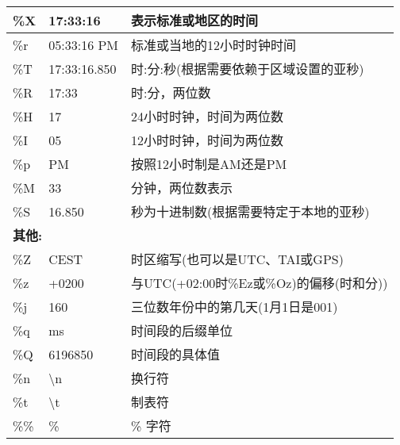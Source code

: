 \begin{itemize}
\begin{longtable}[c]{|lll|}
\multicolumn{1}{|l|}{\%X}            & \multicolumn{1}{l|}{17:33:16}          & 表示标准或地区的时间                        \\ \hline
\multicolumn{1}{|l|}{\%r}            & \multicolumn{1}{l|}{05:33:16 PM}       & 标准或当地的12小时时钟时间                         \\ \hline
\multicolumn{1}{|l|}{\%T} & \multicolumn{1}{l|}{17:33:16.850}             & 时:分:秒(根据需要依赖于区域设置的亚秒)     \\ \hline
\multicolumn{1}{|l|}{\%R}            & \multicolumn{1}{l|}{17:33}             & 时:分，两位数                               \\ \hline
\multicolumn{1}{|l|}{\%H}            & \multicolumn{1}{l|}{17}                & 24小时时钟，时间为两位数                                \\ \hline
\multicolumn{1}{|l|}{\%I}            & \multicolumn{1}{l|}{05}                & 12小时时钟，时间为两位数                                \\ \hline
\multicolumn{1}{|l|}{\%p}            & \multicolumn{1}{l|}{PM}                &按照12小时制是AM还是PM                         \\ \hline
\multicolumn{1}{|l|}{\%M}            & \multicolumn{1}{l|}{33}                & 分钟，两位数表示                                          \\ \hline
\multicolumn{1}{|l|}{\%S} & \multicolumn{1}{l|}{16.850}                   & 秒为十进制数(根据需要特定于本地的亚秒) \\ \hline
\multicolumn{3}{|l|}{\textbf{其他:}}                                                                                                           \\ \hline
\multicolumn{1}{|l|}{\%Z}            & \multicolumn{1}{l|}{CEST}              & 时区缩写(也可以是UTC、TAI或GPS)           \\ \hline
\multicolumn{1}{|l|}{\%z}            & \multicolumn{1}{l|}{+0200}             & 与UTC(+02:00时\%Ez或\%Oz)的偏移(时和分))    \\ \hline
\multicolumn{1}{|l|}{\%j}            & \multicolumn{1}{l|}{160}               & 三位数年份中的第几天(1月1日是001)             \\ \hline
\multicolumn{1}{|l|}{\%q}            & \multicolumn{1}{l|}{ms}                & 时间段的后缀单位                    \\ \hline
\multicolumn{1}{|l|}{\%Q}            & \multicolumn{1}{l|}{6196850}           & 时间段的具体值                          \\ \hline
\multicolumn{1}{|l|}{\%n}            & \multicolumn{1}{l|}{\textbackslash{}n} & 换行符                                               \\ \hline
\multicolumn{1}{|l|}{\%t}            & \multicolumn{1}{l|}{\textbackslash{}t} & 制表符                                             \\ \hline
\multicolumn{1}{|l|}{\%\%}           & \multicolumn{1}{l|}{\%}                & \% 字符                                                    \\ \hline
\end{longtable}


\end{itemize}
